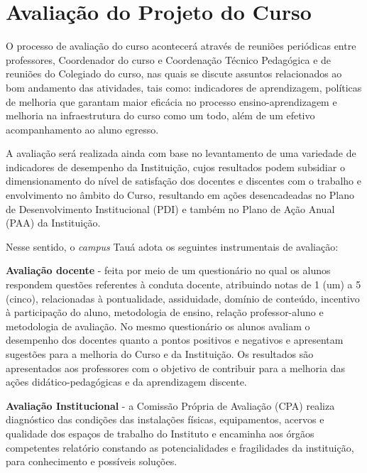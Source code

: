 \documentclass[
	12pt,				%
	openright,			%
	twoside,			%
	a4paper,			%
	chapter=TITLE,		%
	english,			%
	french,				%
	spanish,			%
	brazil,				%
	]{abntex2}
\begin{document}
\chapter{Avaliação do Projeto do Curso}


O processo de avaliação do curso acontecerá através de reuniões periódicas entre professores, Coordenador do curso e Coordenação Técnico Pedagógica e de reuniões do Colegiado do curso, nas quais se discute assuntos relacionados ao bom andamento das atividades, tais como: indicadores de aprendizagem, políticas de melhoria que garantam maior eficácia no processo ensino-aprendizagem e melhoria na infraestrutura do curso como um todo, além de um efetivo acompanhamento ao aluno egresso.

A avaliação será realizada ainda com base no levantamento de uma variedade de indicadores de desempenho da Instituição, cujos resultados podem subsidiar o dimensionamento do nível de satisfação dos docentes e discentes com o trabalho e envolvimento no âmbito do Curso, resultando em ações desencadeadas no Plano de Desenvolvimento Institucional (PDI) e também no Plano de Ação Anual (PAA) da Instituição.

Nesse sentido, o \textit{campus} Tauá adota os seguintes instrumentais de avaliação:
\begin{alineas}
		\item \textbf{Avaliação docente} - feita por meio de um questionário no qual os alunos respondem questões referentes à conduta docente, atribuindo notas de 1 (um) a 5 (cinco), relacionadas à pontualidade, assiduidade, domínio de conteúdo, incentivo à participação do aluno, metodologia de ensino, relação professor-aluno e metodologia de avaliação.  No mesmo questionário os alunos avaliam o desempenho dos docentes quanto a pontos positivos e negativos e apresentam sugestões para a melhoria do Curso e da Instituição. Os resultados são apresentados aos professores com o objetivo de contribuir para a melhoria das ações didático-pedagógicas e da aprendizagem discente.
	\item \textbf{Avaliação Institucional} - a Comissão Própria de Avaliação (CPA) realiza diagnóstico das condições das instalações físicas, equipamentos, acervos e qualidade dos espaços de trabalho do Instituto e encaminha aos órgãos competentes relatório constando as potencialidades e fragilidades da instituição, para conhecimento e possíveis soluções.

\end{alineas}
\end{document}
